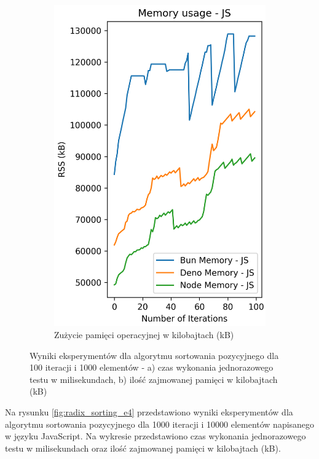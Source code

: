 \begin{figure}[H]
\begin{subfigure}[b]{0.4\textwidth}
    \includegraphics[width=\textwidth]{Figures/sorting/sorting_radix_100_10000_js_memory.png}
    \caption{Zużycie pamięci operacyjnej w kilobajtach (kB)}
    \label{fig:radix_sorting_e3_ts_memory}
  \end{subfigure}
  \hfill
  \caption{Wyniki eksperymentów dla algorytmu sortowania pozycyjnego dla 100 iteracji i 1000 elementów - a) czas wykonania jednorazowego testu w milisekundach, b) ilość zajmowanej pamięci w kilobajtach (kB)}
  \label{fig:radix_sorting_e3_ts}
\end{figure}

Na rysunku \ref{fig:radix_sorting_e4} przedstawiono wyniki eksperymentów dla algorytmu sortowania pozycyjnego dla 1000 iteracji i 10000 elementów napisanego w języku JavaScript. Na wykresie przedstawiono czas wykonania jednorazowego testu w milisekundach oraz ilość zajmowanej pamięci w kilobajtach (kB).


